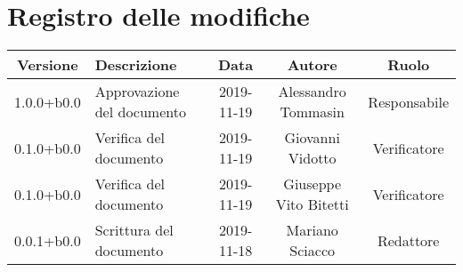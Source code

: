 \section*{Registro delle modifiche}

\begin{center}
	\begin{longtable}{|c|p{3cm}|c|c|c|}
	\hline
	\rowcolor{lighter-grayer}
	\textbf{Versione} & \textbf{Descrizione} & \textbf{Data} & \textbf{Autore} & \textbf{Ruolo} \\
	\hline
	\endfirsthead


	1.0.0+b0.0 & Approvazione del documento & 2019-11-19 & Alessandro Tommasin & Responsabile \\
	\hline
	0.1.0+b0.0 & Verifica del documento & 2019-11-19 & Giovanni Vidotto & Verificatore \\
	\hline
	0.1.0+b0.0 & Verifica del documento & 2019-11-19 & Giuseppe Vito Bitetti & Verificatore \\
	\hline
	0.0.1+b0.0 & Scrittura del documento & 2019-11-18 & Mariano Sciacco & Redattore \\

	\hline

	\end{longtable}
\end{center}
